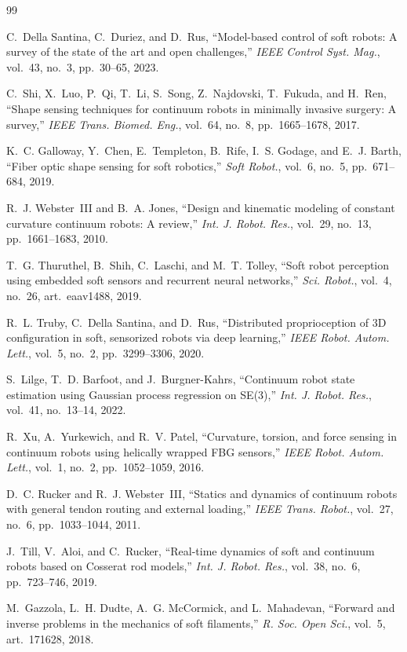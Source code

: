 \documentclass[conference]{IEEEtran}
\begin{document}
\begin{thebibliography}{99}

C.~Della Santina, C.~Duriez, and D.~Rus, ``Model-based control of soft
robots: A survey of the state of the art and open challenges,'' \emph{IEEE
Control Syst. Mag.}, vol.~43, no.~3, pp.~30--65, 2023.

C.~Shi, X.~Luo, P.~Qi, T.~Li, S.~Song, Z.~Najdovski, T.~Fukuda, and H.~Ren,
``Shape sensing techniques for continuum robots in minimally invasive
surgery: A survey,'' \emph{IEEE Trans. Biomed. Eng.}, vol.~64, no.~8,
pp.~1665--1678, 2017.

K.~C. Galloway, Y.~Chen, E.~Templeton, B.~Rife, I.~S. Godage, and E.~J.
Barth, ``Fiber optic shape sensing for soft robotics,'' \emph{Soft Robot.},
vol.~6, no.~5, pp.~671--684, 2019.

R.~J. Webster~III and B.~A. Jones, ``Design and kinematic modeling of
constant curvature continuum robots: A review,'' \emph{Int. J. Robot. Res.},
vol.~29, no.~13, pp.~1661--1683, 2010.

T.~G. Thuruthel, B.~Shih, C.~Laschi, and M.~T. Tolley, ``Soft robot
perception using embedded soft sensors and recurrent neural networks,''
\emph{Sci. Robot.}, vol.~4, no.~26, art.~eaav1488, 2019.

R.~L. Truby, C.~Della Santina, and D.~Rus, ``Distributed proprioception of
3D configuration in soft, sensorized robots via deep learning,'' \emph{IEEE
Robot. Autom. Lett.}, vol.~5, no.~2, pp.~3299--3306, 2020.

S.~Lilge, T.~D. Barfoot, and J.~Burgner-Kahrs, ``Continuum robot state
estimation using Gaussian process regression on SE(3),'' \emph{Int. J.
Robot. Res.}, vol.~41, no.~13--14, 2022.

R.~Xu, A.~Yurkewich, and R.~V. Patel, ``Curvature, torsion, and force
sensing in continuum robots using helically wrapped FBG sensors,''
\emph{IEEE Robot. Autom. Lett.}, vol.~1, no.~2, pp.~1052--1059, 2016.

D.~C. Rucker and R.~J. Webster~III, ``Statics and dynamics of continuum
robots with general tendon routing and external loading,'' \emph{IEEE Trans.
Robot.}, vol.~27, no.~6, pp.~1033--1044, 2011.

J.~Till, V.~Aloi, and C.~Rucker, ``Real-time dynamics of soft and continuum
robots based on Cosserat rod models,'' \emph{Int. J. Robot. Res.}, vol.~38,
no.~6, pp.~723--746, 2019.

M.~Gazzola, L.~H. Dudte, A.~G. McCormick, and L.~Mahadevan, ``Forward and
inverse problems in the mechanics of soft filaments,'' \emph{R. Soc. Open
Sci.}, vol.~5, art.~171628, 2018.

\end{thebibliography}
\end{document}
